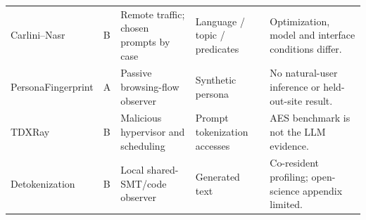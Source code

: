 \begin{table}[!t]
\begin{tabularx}{\textwidth}{@{}>{\raggedright\arraybackslash}p{}>{\raggedright\arraybackslash}p{}>{\raggedright\arraybackslash}p{}>{\raggedright\arraybackslash}p{}Y@{}}
Carlini--Nasr \cite{carlini2024remote} & B & Remote traffic; chosen prompts by case & Language / topic / predicates & Optimization, model and interface conditions differ. \\
PersonaFingerprint\newline \cite{song2026personafingerprint} & A & Passive browsing-flow observer & Synthetic persona & No natural-user inference or held-out-site result. \\
TDXRay \cite{hornetz2026tdxray} & B & Malicious hypervisor and scheduling & Prompt tokenization accesses & AES benchmark is not the LLM evidence. \\
Detokenization\newline \cite{weiss2026detokenization} & B & Local shared-SMT/code observer & Generated text & Co-resident profiling; open-science appendix limited. \\
\bottomrule
\end{tabularx}
\end{table}
\clearpage

